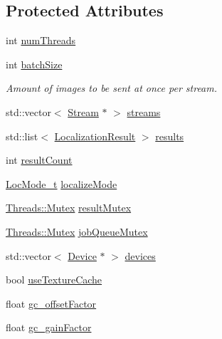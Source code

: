 \subsection*{Protected Attributes}
\begin{DoxyCompactItemize}
\item 
int \hyperlink{class_queued_c_u_d_a_tracker_a1bbaf466f197bd745411786578b743bc}{num\+Threads}
\item 
int \hyperlink{class_queued_c_u_d_a_tracker_a19a027c0cc319821c25de1cb23e14a17}{batch\+Size}
\begin{DoxyCompactList}\small\item\em Amount of images to be sent at once per stream. \end{DoxyCompactList}\item 
std\+::vector$<$ \hyperlink{struct_queued_c_u_d_a_tracker_1_1_stream}{Stream} $\ast$ $>$ \hyperlink{class_queued_c_u_d_a_tracker_a06cc0da8192d0f8ff5d9edcad1158f58}{streams}
\item 
std\+::list$<$ \hyperlink{struct_localization_result}{Localization\+Result} $>$ \hyperlink{class_queued_c_u_d_a_tracker_af29d9427d57a9041fbc581d6e8b0efbf}{results}
\item 
int \hyperlink{class_queued_c_u_d_a_tracker_abdb0a310718f7f1c8a47cf9a3f22728d}{result\+Count}
\item 
\hyperlink{qtrk__c__api_8h_a6ba72ec1daa19642f85a47defe8f0812}{Loc\+Mode\+\_\+t} \hyperlink{class_queued_c_u_d_a_tracker_ae113cc3fb5f12dfadd172ebc5dd20f1a}{localize\+Mode}
\item 
\hyperlink{struct_threads_1_1_mutex}{Threads\+::\+Mutex} \hyperlink{class_queued_c_u_d_a_tracker_ab6bcec14cabbc64d9d96ce0641f5034f}{result\+Mutex}
\item 
\hyperlink{struct_threads_1_1_mutex}{Threads\+::\+Mutex} \hyperlink{class_queued_c_u_d_a_tracker_a57c66fb35caade90cadedd575d7b6c81}{job\+Queue\+Mutex}
\item 
std\+::vector$<$ \hyperlink{struct_queued_c_u_d_a_tracker_1_1_device}{Device} $\ast$ $>$ \hyperlink{class_queued_c_u_d_a_tracker_a333972a0b3e1c98a02e9aab716ef535b}{devices}
\item 
bool \hyperlink{class_queued_c_u_d_a_tracker_a1351abd5ca987de1b8663a919e511134}{use\+Texture\+Cache}
\item 
float \hyperlink{class_queued_c_u_d_a_tracker_a84b6dcf09baa64ba031f7a5a4304d592}{gc\+\_\+offset\+Factor}
\item 
float \hyperlink{class_queued_c_u_d_a_tracker_adba93271c22f7e6800f49ab93ec07c71}{gc\+\_\+gain\+Factor}

\end{DoxyCompactItemize}
